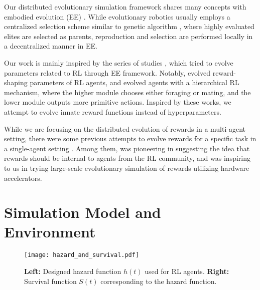 Our distributed evolutionary simulation framework shares many concepts with embodied evolution (EE) \citep{watsonEmbodiedEvolutionDistributing2002,bredecheEmbodiedEvolutionCollective2018}. While evolutionary robotics \citep{nolfiEvolutionaryRoboticsBiology2004} usually employs a centralized selection scheme similar to genetic algorithm \citep{mitchellIntroductionGeneticAlgorithms1998}, where highly evaluated elites are selected as parents,
reproduction and selection are performed locally in a decentralized manner in EE.

Our work is mainly inspired by the series of studies \citep{elfwingBiologicallyInspiredEmbodied2005,elfwingDarwinianEmbodiedEvolution2011,elfwingEmergencePolymorphicMating2014}, which tried to evolve parameters related to RL through EE framework. Notably, \citet{elfwingDarwinianEmbodiedEvolution2011} evolved reward-shaping parameters of RL agents, and \citet{elfwingEmergencePolymorphicMating2014} evolved agents with a hierarchical RL mechanism, where the higher module chooses either foraging or mating, and the lower module outputs more primitive actions. Inspired by these works, we attempt to evolve innate reward functions instead of hyperparameters.

While we are focusing on the distributed evolution of rewards in a multi-agent setting, there were some previous attempts to evolve rewards for a specific task in a single-agent setting \citep{singhWhereRewardsCome2009,niekumEvolutionRewardFunctions2011,zhengWhatCanLearned2020}. Among them, \citet{singhWhereRewardsCome2009} was pioneering in suggesting the idea that rewards should be internal to agents from the RL community, and \citet{zhengWhatCanLearned2020} was inspiring to us in trying large-scale evolutionary simulation of rewards utilizing hardware accelerators.

\section{Simulation Model and Environment}\label{sec:method}

\begin{figure}[t]
  \centering{}
  \texttt{[image: hazard\_and\_survival.pdf]}
  \caption{
    \textbf{Left:} Designed hazard function $h(t)$ used for RL agents.
    \textbf{Right:} Survival function $S(t)$ corresponding to the hazard function.
  }\label{figure:hs}
\end{figure}

